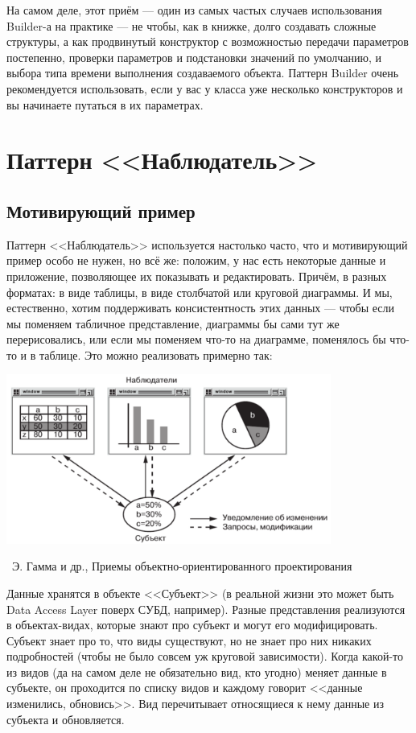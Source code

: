 \documentclass[a5paper]{article}
\newcommand{\attribution}[1] {
    \vspace{-5mm}\begin{flushright}\begin{scriptsize}%
    {\textcopyright\, #1}\end{scriptsize}\end{flushright}
}
\begin{document}
На самом деле, этот приём --- один из самых частых случаев использования Builder-а на практике --- не чтобы, как в книжке, долго создавать сложные структуры, а как продвинутый конструктор с возможностью передачи параметров постепенно, проверки параметров и подстановки значений по умолчанию, и выбора типа времени выполнения создаваемого объекта. Паттерн Builder очень рекомендуется использовать, если у вас у класса уже несколько конструкторов и вы начинаете путаться в их параметрах.

\section{Паттерн <<Наблюдатель>>}

\subsection{Мотивирующий пример}

Паттерн <<Наблюдатель>> используется настолько часто, что и мотивирующий пример особо не нужен, но всё же: положим, у нас есть некоторые данные и приложение, позволяющее их показывать и редактировать. Причём, в разных форматах: в виде таблицы, в виде столбчатой или круговой диаграммы. И мы, естественно, хотим поддерживать консистентность этих данных --- чтобы если мы поменяем табличное представление, диаграммы бы сами тут же перерисовались, или если мы поменяем что-то на диаграмме, поменялось бы что-то и в таблице. Это можно реализовать примерно так:

\begin{center}
    \includegraphics[width=0.8\textwidth]{observerExample.png}
    \attribution{Э. Гамма и др., Приемы объектно-ориентированного проектирования}
\end{center}

Данные хранятся в объекте <<Субъект>> (в реальной жизни это может быть Data Access Layer поверх СУБД, например). Разные представления реализуются в объектах-видах, которые знают про субъект и могут его модифицировать. Субъект знает про то, что виды существуют, но не знает про них никаких подробностей (чтобы не было совсем уж круговой зависимости). Когда какой-то из видов (да на самом деле не обязательно вид, кто угодно) меняет данные в субъекте, он проходится по списку видов и каждому говорит <<данные изменились, обновись>>. Вид перечитывает относящиеся к нему данные из субъекта и обновляется.
\end{document}
